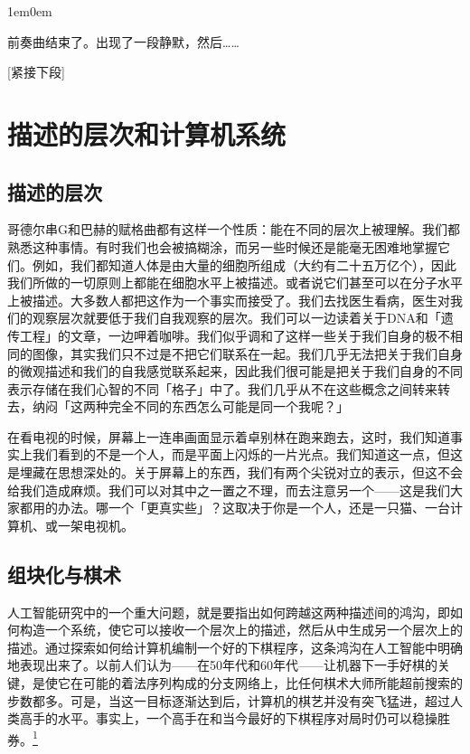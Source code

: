 \documentclass[
  12pt,
  twoside,
  openright,
  oldfontcommands,
]{memoir}
\newenvironment{dialogguide}{%
  \begin{adjustwidth}{1em}{0em}\kaitifamily\itshape\small%
}{%
  \end{adjustwidth}%
}
\begin{document}
\hfill\break

\begin{dialogguide}
前奏曲结束了。出现了一段静默，然后\ldots\ldots{}
\end{dialogguide}

{[}紧接下段{]}

\label{Chapter10.xhtml}{}

\chapter{描述的层次和计算机系统}

\section{描述的层次}

哥德尔串G和巴赫的赋格曲都有这样一个性质：能在不同的层次上被理解。我们都熟悉这种事情。有时我们也会被搞糊涂，而另一些时候还是能毫无困难地掌握它们。例如，我们都知道人体是由大量的细胞所组成（大约有二十五万亿个），因此我们所做的一切原则上都能在细胞水平上被描述。或者说它们甚至可以在分子水平上被描述。大多数人都把这作为一个事实而接受了。我们去找医生看病，医生对我们的观察层次就要低于我们自我观察的层次。我们可以一边读着关于DNA和「遗传工程」的文章，一边呷着咖啡。我们似乎调和了这样一些关于我们自身的极不相同的图像，其实我们只不过是不把它们联系在一起。我们几乎无法把关于我们自身的微观描述和我们的自我感觉联系起来，因此我们很可能是把关于我们自身的不同表示存储在我们心智的不同「格子」中了。我们几乎从不在这些概念之间转来转去，纳闷「这两种完全不同的东西怎么可能是同一个我呢？」

在看电视的时候，屏幕上一连串画面显示着卓别林在跑来跑去，这时，我们知道事实上我们看到的不是一个人，而是平面上闪烁的一片光点。我们知道这一点，但这是埋藏在思想深处的。关于屏幕上的东西，我们有两个尖锐对立的表示，但这不会给我们造成麻烦。我们可以对其中之一置之不理，而去注意另一个------这是我们大家都用的办法。哪一个「更真实些」？这取决于你是一个人，还是一只猫、一台计算机、或一架电视机。

\section{组块化与棋术}

人工智能研究中的一个重大问题，就是要指出如何跨越这两种描述间的鸿沟，即如何构造一个系统，使它可以接收一个层次上的描述，然后从中生成另一个层次上的描述。通过探索如何给计算机编制一个好的下棋程序，这条鸿沟在人工智能中明确地表现出来了。以前人们认为------在50年代和60年代------让机器下一手好棋的关键，是使它在可能的着法序列构成的分支网络上，比任何棋术大师所能超前搜索的步数都多。可是，当这一目标逐渐达到后，计算机的棋艺并没有突飞猛进，超过人类高手的水平。事实上，一个高手在和当今最好的下棋程序对局时仍可以稳操胜券。\hyperref[fn:Chapter10-1]{\textsuperscript{1}}
\end{document}
